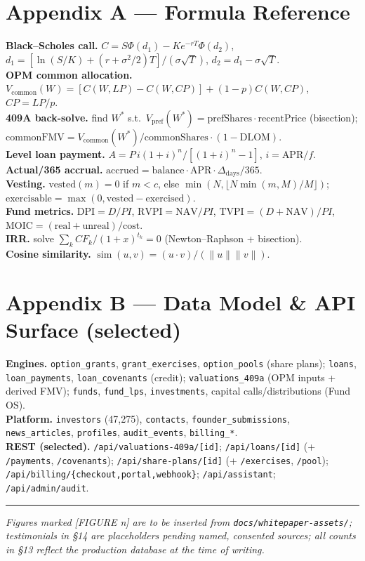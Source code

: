 \documentclass[11pt]{article}
\begin{document}
\section{Appendix A --- Formula Reference}
\textbf{Black--Scholes call.} $C = S\Phi(d_1)-Ke^{-rT}\Phi(d_2)$,
$d_1=[\ln(S/K)+(r+\sigma^2/2)T]/(\sigma\sqrt{T})$, $d_2=d_1-\sigma\sqrt{T}$.\\
\textbf{OPM common allocation.} $V_{\text{common}}(W)=[C(W,LP)-C(W,CP)]+(1-p)C(W,CP)$,
$CP=LP/p$.\\
\textbf{409A back-solve.} find $W^\ast$ s.t.\ $V_{\text{pref}}(W^\ast)=
\text{prefShares}\cdot\text{recentPrice}$ (bisection);
$\text{commonFMV}=V_{\text{common}}(W^\ast)/\text{commonShares}\cdot(1-\text{DLOM})$.\\
\textbf{Level loan payment.} $A=P\,i(1+i)^n/[(1+i)^n-1]$, $i=\text{APR}/f$.\\
\textbf{Actual/365 accrual.} $\text{accrued}=\text{balance}\cdot\text{APR}\cdot
\Delta_{\text{days}}/365$.\\
\textbf{Vesting.} $\text{vested}(m)=0$ if $m<c$, else
$\min(N,\lfloor N\min(m,M)/M\rfloor)$; $\text{exercisable}=\max(0,\text{vested}-
\text{exercised})$.\\
\textbf{Fund metrics.} $\text{DPI}=D/PI$, $\text{RVPI}=\text{NAV}/PI$,
$\text{TVPI}=(D+\text{NAV})/PI$, $\text{MOIC}=(\text{real}+\text{unreal})/\text{cost}$.\\
\textbf{IRR.} solve $\sum_k CF_k/(1+x)^{t_k}=0$ (Newton--Raphson + bisection).\\
\textbf{Cosine similarity.} $\operatorname{sim}(u,v)=(u\cdot v)/(\lVert u\rVert
\lVert v\rVert)$.

\section{Appendix B --- Data Model \& API Surface (selected)}
{\sloppy\small
\textbf{Engines.} \texttt{option\_grants}, \texttt{grant\_exercises},
\texttt{option\_pools} (share plans); \texttt{loans}, \texttt{loan\_payments},
\texttt{loan\_covenants} (credit); \texttt{valuations\_409a} (OPM inputs + derived
FMV); \texttt{funds}, \texttt{fund\_lps}, \texttt{investments}, capital
calls/distributions (Fund OS).\\
\textbf{Platform.} \texttt{investors} (47{,}275), \texttt{contacts},
\texttt{founder\_submissions}, \texttt{news\_articles}, \texttt{profiles},
\texttt{audit\_events}, \texttt{billing\_*}.\\
\textbf{REST (selected).} \texttt{/api/valuations-409a/[id]};
\texttt{/api/loans/[id]} (+ \texttt{/payments}, \texttt{/covenants});
\texttt{/api/share-plans/[id]} (+ \texttt{/exercises}, \texttt{/pool});
\texttt{/api/billing/\{checkout,portal,webhook\}}; \texttt{/api/assistant};
\texttt{/api/admin/audit}.\par}

\vspace{1em}\hrule\vspace{0.6em}
{\small\color{muted}\emph{Figures marked [FIGURE n] are to be inserted from
\texttt{docs/whitepaper-assets/}; testimonials in \S14 are placeholders pending
named, consented sources; all counts in \S13 reflect the production database at the
time of writing.}}
\end{document}
